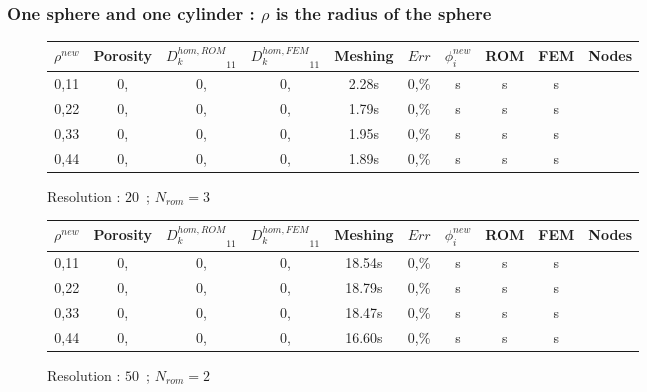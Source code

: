 {\subsubsection{One sphere and one cylinder : $\rho$ is the radius of the sphere}

\begin{comment}
\begin{figure}[H]%
%
\begin{center}
\begin{tabular}{|c|c||c|c||c|c||c|c||c||c|}
\hline
\rowcolor{lightgray} $\rho^{new}$&Porosity&${D_k^{hom,ROM}}_{11}$&${D_k^{hom,FEM}}_{11}$&Meshing&$Err$&$\phi_i^{new}$&ROM&FEM&Nodes\\
\hline
0,11&0,&0,&0,&s&0,\%&s&s&s&\\
\hline
0,22&0,&0,&0,&s&0,\%&s&s&s&\\
\hline
0,33&0,&0,&0,&s&0,\%&s&s&s&\\
\hline
0,44&0,&0,&0,&s&0,\%&s&s&s&\\
\hline
\end{tabular}
\end{center}
\caption{Resolution : $10$\ ; $N_{rom}=4$}
%
\end{figure}
\end{comment}

\begin{figure}[H]%
%
\begin{center}
\begin{tabular}{|c|c||c|c||c|c||c|c||c||c|}
\hline
\rowcolor{lightgray} $\rho^{new}$&Porosity&${D_k^{hom,ROM}}_{11}$&${D_k^{hom,FEM}}_{11}$&Meshing&$Err$&$\phi_i^{new}$&ROM&FEM&Nodes\\
\hline
0,11&0,&0,&0,&2.28s&0,\%&s&s&s&\\
\hline
0,22&0,&0,&0,&1.79s&0,\%&s&s&s&\\
\hline
0,33&0,&0,&0,&1.95s&0,\%&s&s&s&\\
\hline
0,44&0,&0,&0,&1.89s&0,\%&s&s&s&\\
\hline
\end{tabular}
\end{center}
\caption{Resolution : $20$\ ; $N_{rom}=3$}
%
\end{figure}

\begin{figure}[H]%
%
\begin{center}
\begin{tabular}{|c|c||c|c||c|c||c|c||c||c|}
\hline
\rowcolor{lightgray} $\rho^{new}$&Porosity&${D_k^{hom,ROM}}_{11}$&${D_k^{hom,FEM}}_{11}$&Meshing&$Err$&$\phi_i^{new}$&ROM&FEM&Nodes\\
\hline
0,11&0,&0,&0,&18.54s&0,\%&s&s&s&\\
\hline
0,22&0,&0,&0,&18.79s&0,\%&s&s&s&\\
\hline
0,33&0,&0,&0,&18.47s&0,\%&s&s&s&\\
\hline
0,44&0,&0,&0,&16.60s&0,\%&s&s&s&\\
\hline
\end{tabular}
\end{center}
\caption{Resolution : $50$\ ; $N_{rom}=2$}
%
\end{figure}

}

